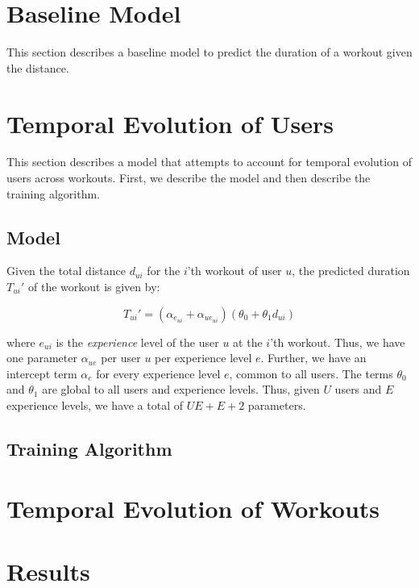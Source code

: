 \documentclass{acm_proc_article-sp}
\begin{document}
\section{Baseline Model}
\label{secBaselineModel}
This section describes a baseline model to predict the duration of a workout given the distance.

\section{Temporal Evolution of Users}
\label{secTemporalModelUsers}
This section describes a model that attempts to account for temporal evolution of users across workouts. First, we describe the model and then describe the training algorithm.

\subsection{Model}
Given the total distance $d_{ui}$ for the $i$'th workout of user $u$, the predicted duration $T_{ui}'$ of the workout is given by:

$$T_{ui}' = (\alpha_{e_{ui}} + \alpha_{ue_{ui}})(\theta_0 + \theta_1 d_{ui})$$

where $e_{ui}$ is the \emph{experience} level of the user $u$ at the $i$'th workout. Thus, we have one parameter $\alpha_{ue}$ per user $u$ per experience level $e$. Further, we have an intercept term $\alpha_e$ for every experience level $e$, common to all users. The terms $\theta_0$ and $\theta_1$ are global to all users and experience levels. Thus, given $U$ users and $E$ experience levels, we have a total of $UE + E + 2$ parameters. 

\subsection{Training Algorithm}

\section{Temporal Evolution of Workouts}
\label{secTemporalModelWorkouts}

\section{Results}
\end{document}
